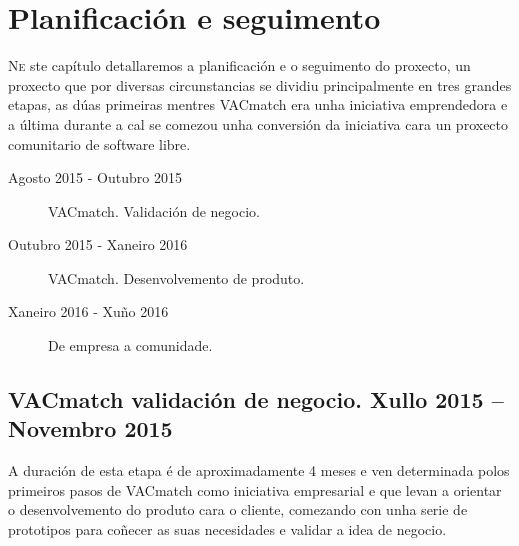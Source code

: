 \chapter{Planificación e seguimento}
\minitoc


  \lettrine{N}{e} ste capítulo detallaremos a planificación e o seguimento do 
proxecto, un proxecto que por diversas circunstancias se dividiu principalmente 
en tres grandes etapas, as dúas primeiras mentres VACmatch era unha iniciativa 
emprendedora e a última durante a cal se comezou unha conversión da iniciativa 
cara un proxecto comunitario de software libre.


  \begin{description}
    \item [Agosto 2015 - Outubro 2015] VACmatch. Validación de negocio.
    \item [Outubro 2015 - Xaneiro 2016] VACmatch. Desenvolvemento de produto.
    \item [Xaneiro 2016 - Xuño 2016] De empresa a comunidade.
  \end{description}


  \section{VACmatch validación de negocio. Xullo 2015 -- Novembro 2015}

  A duración de esta etapa é de aproximadamente 4 meses e ven determinada polos 
primeiros pasos de VACmatch como iniciativa empresarial e que levan a orientar 
o desenvolvemento do produto cara o cliente, comezando con unha serie de 
prototipos para coñecer as suas necesidades e validar a idea de 
negocio.

